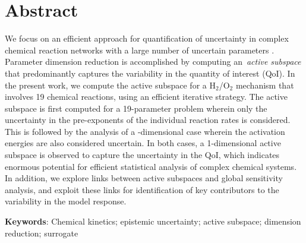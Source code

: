 \section*{Abstract}
We focus on an efficient approach for quantification of uncertainty in complex chemical
reaction networks with a large number of uncertain parameters .  Parameter
dimension reduction is accomplished by computing an~\emph{active subspace} that
predominantly captures the variability in the quantity of interest (QoI).  In
the present work, we compute the active subspace for a H$_2$/O$_2$ mechanism 
that involves 19 chemical reactions, using an efficient iterative strategy.  The
active subspace is first computed for a 19-parameter problem wherein only the
uncertainty in the pre-exponents of the individual reaction rates is
considered. This is followed by the analysis of a -dimensional case wherein
the activation energies  are also considered uncertain.  In both cases, a
1-dimensional active subspace is observed to capture the uncertainty in the QoI,
 which indicates enormous
potential for efficient statistical analysis of complex chemical systems. In
addition, we explore links between active subspaces and global sensitivity
analysis, and exploit these links for identification of key
contributors to the variability in the model response.
\bigskip

\noindent \textbf{Keywords}: Chemical kinetics; epistemic uncertainty; active subspace; dimension reduction; surrogate
